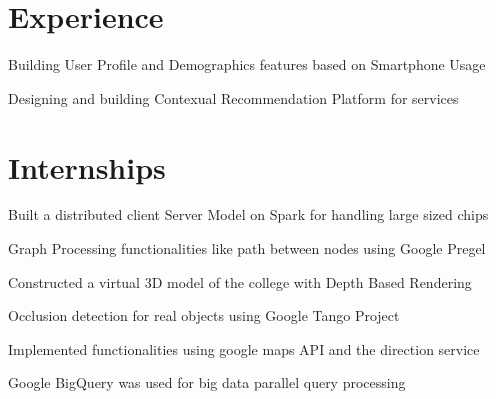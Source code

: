 \documentclass[]{deedy-resume-openfont}
\begin{document}
\hfill
\begin{minipage}[t]{0.66\textwidth} 


\section{Experience}

\vspace{\topsep} %
\begin{tightemize}
\item Building User Profile and Demographics features based on Smartphone Usage 
\item Designing and building Contexual Recommendation Platform for services 
\end{tightemize}
\sectionsep


\section{Internships}

\begin{tightemize}
\item Built a distributed client Server Model on Spark for handling large sized chips
\item Graph Processing functionalities like path between nodes using Google Pregel 
\end{tightemize}
\sectionsep

\begin{tightemize}
\item Constructed a virtual 3D model of the college with Depth Based Rendering
\item Occlusion detection for real objects using Google Tango Project 
\end{tightemize}
\sectionsep

\begin{tightemize}
\item Implemented functionalities using google maps API and the direction service 
\item Google BigQuery was used for big data parallel query processing
\end{tightemize}
\sectionsep


\end{minipage}
\end{document}
